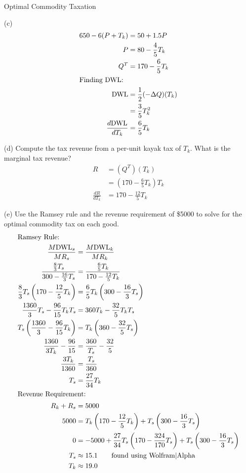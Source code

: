 \documentclass[8pt]{extarticle}
\begin{document}
\begin{problem}{Optimal Commodity Taxation}
\begin{problem}{(c)}
\begin{align*}
        650 - 6(P + T_k) &= 50 + 1.5P\\
        P &= 80 - \frac{4}{5}T_k\\
        Q^T &= 170-\frac{6}{5}T_k\\
        \shortintertext{Finding DWL:}
        \text{DWL} &= \frac{1}{2}(-\Delta Q)(T_k)\\
                   &= \frac{3}{5}T_k^2\\
        \frac{d\text{DWL}}{dT_k} &= \frac{6}{5}T_k
      \end{align*}
    \end{problem}
    \begin{problem}{(d)}
      Compute the tax revenue from a per-unit kayak tax of $T_k$. What is the marginal tax revenue?
      \tcblower
      \begin{align*}
        R &= \left(Q^T\right)(T_k)\\
          &= \left(170-\frac{6}{5}T_k\right)T_k\\
        \frac{dR}{dT_k} &= 170 - \frac{12}{5}T_k
      \end{align*}
    \end{problem}
    \begin{problem}{(e)}
      Use the Ramsey rule and the revenue requirement of \$5000 to solve for the optimal commodity tax on each good.
      \tcblower
      \begin{align*}
        \shortintertext{Ramsey Rule:}
        \frac{M\text{DWL}_s}{MR_s} &= \frac{M\text{DWL}_k}{MR_k}\\
        \frac{\frac{8}{3}T_s}{300-\frac{16}{3}T_s} &= \frac{\frac{6}{5}T_k}{170-\frac{12}{5}T_k}\\
        \frac{8}{3}T_s\left(170-\frac{12}{5}T_k\right) &= \frac{6}{5}T_k\left(300-\frac{16}{3}T_s\right)\\
        \frac{1360}{3}T_s - \frac{96}{15}T_kT_s &= 360T_k - \frac{32}{5}T_kT_s\\
        T_s \left(\frac{1360}{3} - \frac{96}{15}T_k\right) &= T_k \left(360 - \frac{32}{5}T_s\right)\\
        \frac{1360}{3T_k} - \frac{96}{15} &= \frac{360}{T_s} - \frac{32}{5}\\
        \frac{3T_k}{1360} &= \frac{T_s}{360}\\
        T_s &= \frac{27}{34}T_k\\
        \shortintertext{Revenue Requirement:}
        R_{k} + R_s &= 5000\\
        5000 &= T_k\left(170 - \frac{12}{5}T_k\right) + T_s\left(300 - \frac{16}{3}T_s\right)\\
        0 &= -5000 + \frac{27}{34}T_s\left(170 - \frac{324}{170}T_s\right) + T_s \left(300 - \frac{16}{3}T_s\right)\\
        T_s &\approx 15.1 \tag*{found using Wolfram|Alpha}\\
        T_k &\approx 19.0
      \end{align*}
    \end{problem}
  \end{problem}
\end{document}
